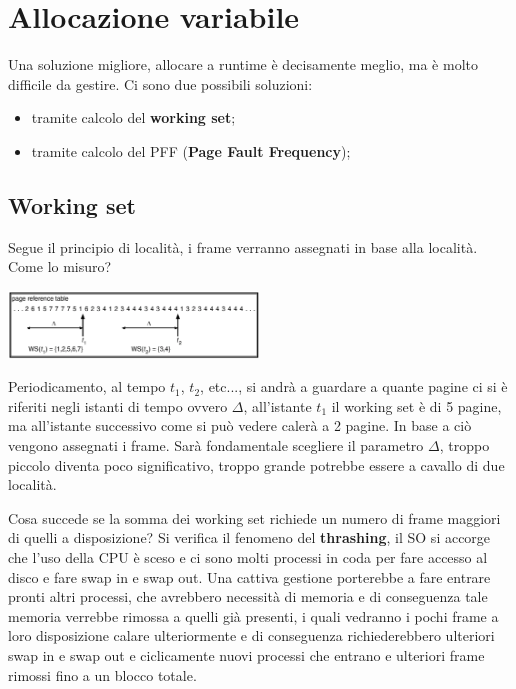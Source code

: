 \documentclass[a4paper, 12pt]{book}
\begin{document}
\section{Allocazione variabile}

Una soluzione migliore, allocare a runtime è decisamente meglio, ma è molto difficile da gestire. Ci sono due possibili soluzioni:
\begin{itemize}
    \item tramite calcolo del \textbf{working set};
    \item tramite calcolo del PFF (\textbf{Page Fault Frequency});
\end{itemize}

\subsection{Working set}

Segue il principio di località, i frame verranno assegnati in base alla località. Come lo misuro? 

\begin{center}
    \includegraphics[width=0.5\textwidth]{working_set.png}
\end{center}
Periodicamento, al tempo $t_1$, $t_2$, etc..., si andrà a guardare a quante pagine ci si è riferiti negli istanti di tempo ovvero 
$\Delta$, all'istante $t_1$ il working set è di 5 pagine, ma all'istante successivo come si può vedere calerà a 2 pagine. In base a ciò
vengono assegnati i frame. Sarà fondamentale scegliere il parametro $\Delta$, troppo piccolo diventa poco significativo, troppo 
grande potrebbe essere a cavallo di due località. 

Cosa succede se la somma dei working set richiede un numero di frame maggiori di quelli a disposizione? Si verifica il fenomeno del 
\textbf{thrashing}, il SO si accorge che l'uso della CPU è sceso e ci sono molti processi in coda per fare accesso al disco e fare 
swap in e swap out. Una cattiva gestione porterebbe a fare entrare pronti altri processi, che avrebbero necessità
di memoria e di conseguenza tale memoria verrebbe rimossa a quelli già presenti, i quali vedranno i pochi frame a loro disposizione 
calare ulteriormente e di conseguenza richiederebbero ulteriori swap in e swap out e ciclicamente nuovi processi che entrano e 
ulteriori frame rimossi fino a un blocco totale. 
\end{document}
